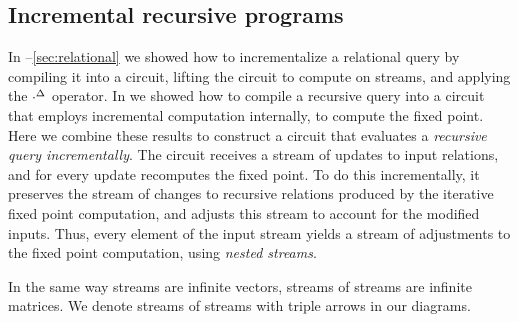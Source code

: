 \subsection{Incremental recursive programs}\label{sec:nested}

In --\ref{sec:relational} we showed how to
incrementalize a relational query by compiling it into a circuit,
lifting the circuit to compute on streams, and applying the
${\cdot}^{\Delta}$ operator.  In  we showed how to
compile a recursive query into a circuit that employs incremental
computation internally, to compute the fixed point.  Here we combine
these results to construct a circuit that evaluates a \emph{recursive
query incrementally}.  The circuit receives a stream of updates to
input relations, and for every update recomputes the fixed point.  To
do this incrementally, it preserves the stream of changes to recursive
relations produced by the iterative fixed point computation, and
adjusts this stream to account for the modified inputs.  Thus, every
element of the input stream yields a stream of adjustments to the
fixed point computation, using \emph{nested streams}.

In the same way streams are infinite vectors, streams of streams are
infinite matrices.  We denote streams of streams with triple arrows in
our diagrams.



